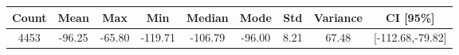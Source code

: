 \begin{tabular}{|c|c|c|c|c|c|c|c|c|}\hline
\rowcolor{Plum!20}
Count&Mean&Max&Min&Median&Mode&Std&Variance&CI [95\%]\\\hline\hline
4453&-96.25&-65.80&-119.71&-106.79&-96.00&8.21&67.48&[-112.68,-79.82]\\\hline
\end{tabular}
